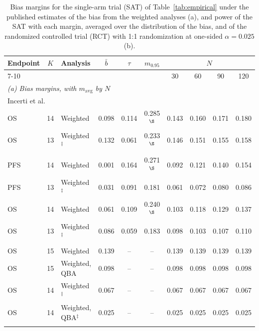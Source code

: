 \begin{table}[!htb]
\centering
\small
\setlength{\tabcolsep}{3pt}
\caption{Bias margins for the single-arm trial (SAT) of Table~\ref{tab:empirical} under the published estimates of the bias from the weighted analyses (a), and power of the SAT with each margin, averaged over the distribution of the bias, and of the randomized controlled trial (RCT) with 1:1 randomization at one-sided $\alpha = 0.025$ (b).}
\label{tab:margins}
\begin{tabular}{lclccccccc}
\toprule
Endpoint & $K$ & Analysis & $\bar{b}$ & $\tau$ & $m_{0.95}$ & \multicolumn{4}{c}{$N$} \\
\cmidrule(lr){7-10}
 & & & & & & 30 & 60 & 90 & 120 \\
\midrule
\multicolumn{10}{l}{\textit{(a) Bias margins, with $m_{\mathrm{avg}}$ by $N$}} \\
\multicolumn{10}{l}{Incerti et al.~\cite{Incerti2023}} \\
OS & 14 & Weighted & 0.098 & 0.114 & 0.285$^{\S}$ & 0.143 & 0.160 & 0.171 & 0.180 \\
OS & 13 & Weighted$^{\ddagger}$ & 0.132 & 0.061 & 0.233$^{\S}$ & 0.146 & 0.151 & 0.155 & 0.158 \\
\addlinespace
\multicolumn{10}{l}{Bahmane et al.~\cite{Bahmane2025}} \\
PFS & 14 & Weighted & 0.001 & 0.164 & 0.271$^{\S}$ & 0.092 & 0.121 & 0.140 & 0.154 \\
PFS & 13 & Weighted$^{\ddagger}$ & 0.031 & 0.091 & 0.181 & 0.061 & 0.072 & 0.080 & 0.086 \\
OS & 14 & Weighted & 0.061 & 0.109 & 0.240$^{\S}$ & 0.103 & 0.118 & 0.129 & 0.137 \\
OS & 13 & Weighted$^{\ddagger}$ & 0.086 & 0.059 & 0.183 & 0.098 & 0.103 & 0.107 & 0.110 \\
\addlinespace
\multicolumn{10}{l}{Gupta et al.~\cite{Gupta2025}} \\
OS & 15 & Weighted & 0.139 & -- & -- & 0.139 & 0.139 & 0.139 & 0.139 \\
OS & 15 & Weighted, QBA & 0.098 & -- & -- & 0.098 & 0.098 & 0.098 & 0.098 \\
OS & 14 & Weighted$^{\ddagger}$ & 0.067 & -- & -- & 0.067 & 0.067 & 0.067 & 0.067 \\
OS & 14 & Weighted, QBA$^{\ddagger}$ & 0.025 & -- & -- & 0.025 & 0.025 & 0.025 & 0.025 \\
\addlinespace
\multicolumn{10}{l}{\textit{(b) Power by $N$, averaged over the distribution of the bias}} \\

\end{tabular}
\end{table}
